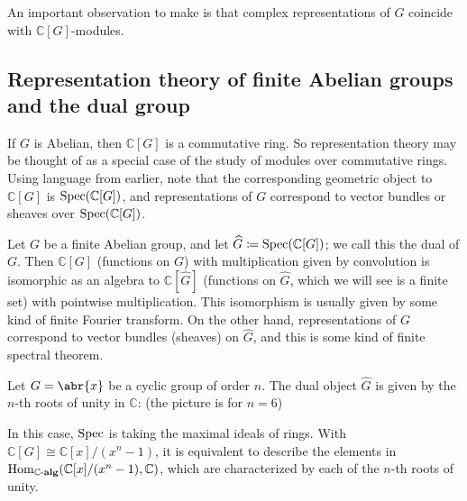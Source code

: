 \documentclass[../../rtnotes.tex]{subfiles}
\begin{document}
An important observation to make is that complex representations of $G$ coincide with $\mathbb C[G]$-modules. 

\subsection{Representation theory of finite Abelian groups and the dual group}
If $G$ is Abelian, then $\mathbb C[G]$ is a commutative ring. So representation theory may be thought of as a special case of the study of modules over commutative rings. Using language from earlier, note that the corresponding geometric object to $\mathbb C[G]$ is $\operatorname{Spec}(\mathbb C[G])$, and representations of $G$ correspond to vector bundles or sheaves over $\operatorname{Spec}(\mathbb C[G])$.

Let $G$ be a finite Abelian group, and let $\widehat G\coloneqq \operatorname{Spec}(\mathbb C[G])$; we call this the dual of $G$. Then $\mathbb C[G]$ (functions on $G$) with multiplication given by convolution is isomorphic as an algebra to $\mathbb C[\widehat G]$ (functions on $\widehat{G}$, which we will see is a finite set) with pointwise multiplication. This isomorphism is usually given by some kind of finite Fourier transform. On the other hand, representations of $G$ correspond to vector bundles (sheaves) on $\widehat G$, and this is some kind of finite spectral theorem.

Let $G = \abr{x}$ be a cyclic group of order $n$. The dual object $\widehat{G}$ is given by the $n$-th roots of unity in $\mathbb C$: (the picture is for $n=6$)

\begin{figure}[h]
  \centering
\end{figure}

In this case, $\operatorname{Spec}$ is taking the maximal ideals of rings. With $\mathbb C[G]\cong \mathbb C[x]/(x^n-1)$, it is equivalent to describe the elements in $\operatorname{Hom}_{\mathbb C\text{-}{\normalfont\mathbf{alg}}}(\mathbb C[x]/(x^n-1),\mathbb C)$, which are characterized by each of the $n$-th roots of unity.
\end{document}
